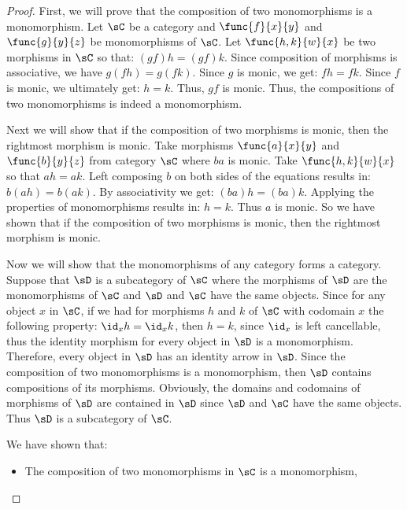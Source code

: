 \documentclass[main.tex]{subfiles}
\begin{document}
\begin{proof}
	First, we will prove that the composition of two monomorphisms is a
	monomorphism. Let \(\sC\) be a category and \(\func{f}{x}{y}\) and
	\(\func{g}{y}{z}\) be monomorphisms of \(\sC\). Let \(\func{h,k}{w}{x}\) be
	two morphisms in \(\sC\) so that: \((gf)h=(gf)k\). Since composition of
	morphisms is associative, we have \(g(fh)=g(fk)\). Since \(g\) is monic, we
	get: \(fh=fk.\) Since \(f\) is monic, we ultimately get: \(h=k.\) Thus,
	\(gf\) is monic. Thus, the compositions of two monomorphisms is indeed a
	monomorphism.

	Next we will show that if the composition of two morphisms is monic, then
	the rightmost morphism is monic. Take morphisms \(\func{a}{x}{y}\) and
	\(\func{b}{y}{z}\) from category \(\sC\) where \(ba\) is monic. Take
	\(\func{h,k}{w}{x}\) so that \(ah=ak\). Left composing \(b\) on both sides
	of the equations results in: \(b(ah)=b(ak)\). By associativity we get:
	\((ba)h=(ba)k\). Applying the properties of monomorphisms results in:
	\(h=k\). Thus \(a\) is monic. So we have shown that if the composition of two
	morphisms is monic, then the rightmost morphism is monic.

	Now we will show that the monomorphisms of any category forms a category.
	Suppose that \(\sD\) is a subcategory of \(\sC\) where the morphisms of
	\(\sD\) are the monomorphisms of \(\sC\) and \(\sD\) and \(\sC\) have the
	same objects. Since for any object \(x\) in \(\sC\), if we had for morphisms
	\(h\) and \(k\) of \(\sC\) with codomain \(x\) the following property:
	\(\id_{x}h=\id_{x}k\), then \(h=k\), since \(\id_{x}\) is left cancellable,
	thus the identity morphism for every object in \(\sD\) is a monomorphism.
	Therefore, every object in \(\sD\) has an identity arrow in \(\sD\). Since
	the composition of two monomorphisms is a monomorphism, then \(\sD\)
	contains compositions of its morphisms. Obviously, the domains and codomains
	of morphisms of \(\sD\) are contained in \(\sD\) since \(\sD\) and \(\sC\)
	have the same objects. Thus \(\sD\) is a subcategory of \(\sC\).

	We have shown that:
	\begin{itemize}
		\item The composition of two monomorphisms in \(\sC\) is a monomorphism,


\end{itemize}
\end{proof}
\end{document}
